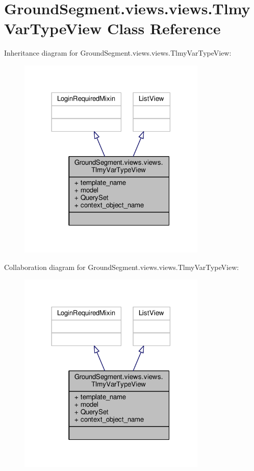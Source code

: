 \hypertarget{class_ground_segment_1_1views_1_1views_1_1_tlmy_var_type_view}{}\section{Ground\+Segment.\+views.\+views.\+Tlmy\+Var\+Type\+View Class Reference}
\label{class_ground_segment_1_1views_1_1views_1_1_tlmy_var_type_view}


Inheritance diagram for Ground\+Segment.\+views.\+views.\+Tlmy\+Var\+Type\+View\+:\nopagebreak
\begin{figure}[H]
\begin{center}
\leavevmode
\includegraphics[width=254pt]{class_ground_segment_1_1views_1_1views_1_1_tlmy_var_type_view__inherit__graph}
\end{center}
\end{figure}


Collaboration diagram for Ground\+Segment.\+views.\+views.\+Tlmy\+Var\+Type\+View\+:\nopagebreak
\begin{figure}[H]
\begin{center}
\leavevmode
\includegraphics[width=254pt]{class_ground_segment_1_1views_1_1views_1_1_tlmy_var_type_view__coll__graph}
\end{center}
\end{figure}
